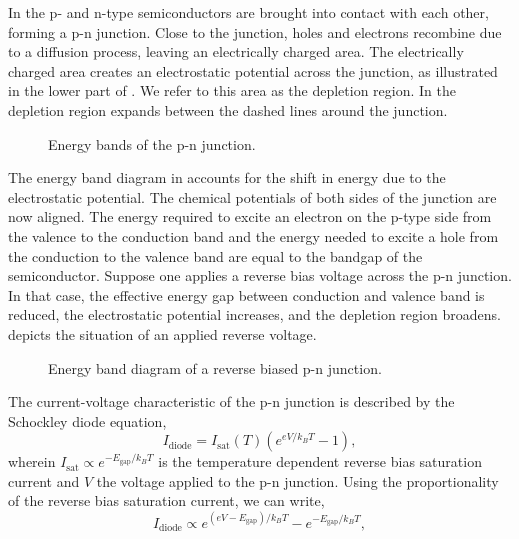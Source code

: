 In  the p- and n-type semiconductors are brought into contact with each other, forming a p-n junction.
Close to the junction, holes and electrons recombine due to a diffusion process, leaving an electrically charged area.
The electrically charged area creates an electrostatic potential across the junction, as illustrated in the lower part of .
We refer to this area as the depletion region.
In  the depletion region expands between the dashed lines around the junction.
\begin{figure}[H]
	\centering
	
	\caption{Energy bands of the p-n junction.}\label{fig:pn_junction}
\end{figure}
The energy band diagram in  accounts for the shift in energy due to the electrostatic potential.
The chemical potentials of both sides of the junction are now aligned.
The energy required to excite an electron on the p-type side from the valence to the conduction band and the energy needed to excite a hole from the conduction to the valence band are equal to the bandgap of the semiconductor.
Suppose one applies a reverse bias voltage across the p-n junction. In that case, the effective energy gap between conduction and valence band is reduced, the electrostatic potential increases, and the depletion region broadens.
 depicts the situation of an applied reverse voltage.
\begin{figure}[H]
	\centering
	
	\caption{Energy band diagram of a reverse biased p-n junction.}\label{fig:pn_junction_reverse}
\end{figure}
The current-voltage characteristic of the p-n junction is described by the Schockley diode equation,
\begin{equation}
	I_\text{diode}=I_\text{sat}(T)\left(e^{eV/k_BT}-1\right)
	\label{eq:diode_current},
\end{equation}
wherein $I_\text{sat}\propto e^{-E_\text{gap}/k_BT}$ is the temperature dependent reverse bias saturation current and $V$ the voltage applied to the p-n junction.
Using the proportionality of the reverse bias saturation current, we can write,
\begin{equation}
	I_\text{diode}\propto e^{\left(eV-E_\text{gap}\right)/k_BT}-e^{-E_\text{gap}/k_BT}\label{eq:diode_current_prop},
\end{equation} 
